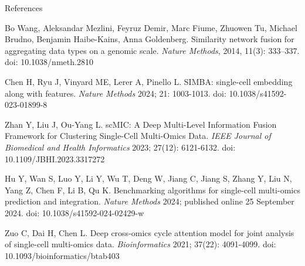 \documentclass{beamer}
\begin{document}
\begin{frame}[allowframebreaks]{References}
\tiny

\begin{thebibliography}{5}

Bo Wang, Aleksandar Mezlini, Feyruz Demir, Marc Fiume, Zhuowen Tu, Michael Brudno, Benjamin Haibe-Kains, Anna Goldenberg.
\newblock Similarity network fusion for aggregating data types on a genomic scale.
\newblock \emph{Nature Methods}, 2014, 11(3): 333–337.
\newblock doi: 10.1038/nmeth.2810

Chen H, Ryu J, Vinyard ME, Lerer A, Pinello L.
\newblock SIMBA: single-cell embedding along with features.
\newblock \emph{Nature Methods} 2024; 21: 1003-1013.
\newblock doi: 10.1038/s41592-023-01899-8

Zhan Y, Liu J, Ou-Yang L.
\newblock scMIC: A Deep Multi-Level Information Fusion Framework for Clustering Single-Cell Multi-Omics Data.
\newblock \emph{IEEE Journal of Biomedical and Health Informatics} 2023; 27(12): 6121-6132.
\newblock doi: 10.1109/JBHI.2023.3317272

Hu Y, Wan S, Luo Y, Li Y, Wu T, Deng W, Jiang C, Jiang S, Zhang Y, Liu N, Yang Z, Chen F, Li B, Qu K.
\newblock Benchmarking algorithms for single-cell multi-omics prediction and integration.
\newblock \emph{Nature Methods} 2024; published online 25 September 2024.
\newblock doi: 10.1038/s41592-024-02429-w

Zuo C, Dai H, Chen L.
\newblock Deep cross-omics cycle attention model for joint analysis of single-cell multi-omics data.
\newblock \emph{Bioinformatics} 2021; 37(22): 4091-4099.
\newblock doi: 10.1093/bioinformatics/btab403

\end{thebibliography}
\end{frame}
\end{document}
